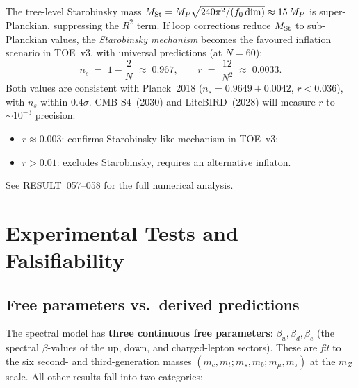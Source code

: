 \documentclass[12pt]{article}
\theoremstyle{definition}
\theoremstyle{remark}
\begin{document}
The tree-level Starobinsky mass $M_{\rm St} = M_P\sqrt{240\pi^2/(f_0\,\mathrm{dim})} \approx 15\,M_P$ is
super-Planckian, suppressing the $R^2$ term.  If loop corrections reduce $M_{\rm St}$
to sub-Planckian values, the \emph{Starobinsky mechanism} becomes the favoured
inflation scenario in TOE~v3, with universal predictions (at $N = 60$):
\begin{equation}\label{eq:cmb}
  n_s \;=\; 1 - \frac{2}{N} \;\approx\; 0.967, \qquad
  r \;=\; \frac{12}{N^2} \;\approx\; 0.0033.
\end{equation}
Both values are consistent with Planck~2018 ($n_s = 0.9649\pm 0.0042$,
$r < 0.036$), with $n_s$ within $0.4\sigma$.  CMB-S4~(2030) and
LiteBIRD~(2028) will measure $r$ to $\sim 10^{-3}$ precision:
\begin{itemize}
\item $r \approx 0.003$: confirms Starobinsky-like mechanism in TOE~v3;
\item $r > 0.01$: excludes Starobinsky, requires an alternative inflaton.
\end{itemize}
See RESULT~057--058 for the full numerical analysis.

\section{Experimental Tests and Falsifiability}
\label{sec:tests}

\subsection*{Free parameters vs.\ derived predictions}
The spectral model has \textbf{three continuous free parameters}:
$\beta_u, \beta_d, \beta_e$ (the spectral $\beta$-values of the up, down,
and charged-lepton sectors).  These are \emph{fit} to the six
second- and third-generation masses
$(m_c, m_t; m_s, m_b; m_\mu, m_\tau)$
at the $m_Z$ scale.  All other results fall into two categories:
\end{document}
